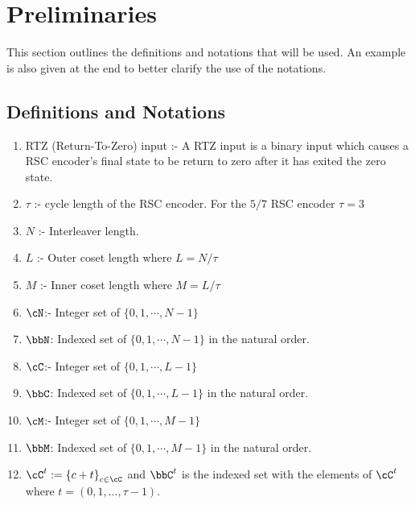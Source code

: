 

\section{Preliminaries}
This section outlines the definitions and notations that will be used. An example is also given at the end to better clarify the use of the notations.
\subsection{Definitions and Notations}
\begin{enumerate}
\item RTZ (Return-To-Zero) input :- A RTZ input is a binary input which causes a RSC encoder's final state to be return to zero after it has exited the zero state.

\item $\tau$ :- cycle length of the RSC encoder. For the $5/7$ RSC encoder $\tau = 3$

\item $N$ :- Interleaver length. 

\item $L$ :- Outer coset length where $L=N/\tau$

\item $M$ :- Inner coset length where $M=L/\tau$

\item $\cN$:- Integer set of $\{0,1,\cdots,N-1\}$

\item $\bbN$: Indexed set  of $\{0,1,\cdots,N-1\}$ in the natural order.

\item $\cC$:- Integer set of $\{0,1,\cdots,L-1\}$

\item $\bbC$: Indexed set  of $\{0,1,\cdots,L-1\}$ in the natural order.

\item $\cM$:- Integer set of $\{0,1,\cdots,M-1\}$

\item $\bbM$: Indexed set  of $\{0,1,\cdots,M-1\}$ in the natural order.

\item $\cC^{t}:=\left\{c+t\right\}_{c \in \cC}$ and $\bbC^t$ is the indexed set with the elements of $\cC^t$ where  $t=(0,1,...,\tau-1)$. 


\end{enumerate}
